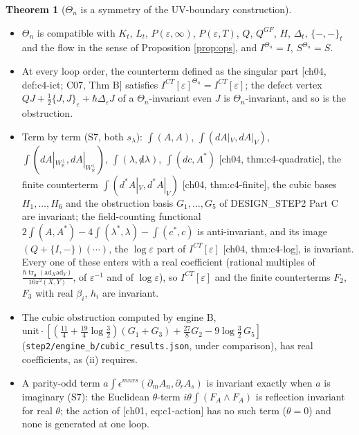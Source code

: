 \documentclass[11pt]{article}
\theoremstyle{definition}
\newtheorem{theorem}[definition]{Theorem}
\begin{document}
\begin{theorem}[$\Theta_n$ is a symmetry of the UV-boundary construction]
\label{thm:inv}
\begin{itemize}
\item[(i)] $\Theta_n$ is compatible with $K_t$, $L_t$, $P(\varepsilon,\infty)$, $P(\varepsilon,T)$, $Q$, $Q^{GF}$, $H$, $\Delta_t$, $\{-,-\}_t$ and the flow in the sense of Proposition \ref{prop:ops}, and $I^{\Theta_n}=I$, $S^{\Theta_n}=S$.
\item[(ii)] At every loop order, the counterterm defined as the singular part [ch04, def:c4-ict; C07, Thm B] satisfies $I^{CT}[\varepsilon]^{\Theta_n}=I^{CT}[\varepsilon]$; the defect vertex $QJ+\frac12\{J,J\}_\varepsilon+\hbar\Delta_\varepsilon J$ of a $\Theta_n$-invariant even $J$ is $\Theta_n$-invariant, and so is the obstruction.
\item[(iii)] Term by term (S7, both $s_\lambda$): $\int(A,A)$, $\int(dA|_V,dA|_V)$, $\int(dA|_{W^\perp_{\mathbb R}},dA|_{W^\perp_{\mathbb R}})$, $\int(\lambda,{\not d}\lambda)$, $\int(dc,A^*)$ [ch04, thm:c4-quadratic], the finite counterterm $\int(d^*A|_V,d^*A|_V)$ [ch04, thm:c4-finite], the cubic bases $H_1,\dots,H_6$ and the obstruction basis $G_1,\dots,G_5$ of DESIGN\_STEP2 Part C are invariant; the field-counting functional $2\int(A,A^*)-4\int(\lambda^*,\lambda)-\int(c^*,c)$ is anti-invariant, and its image $(Q+\{I,-\})(\cdots)$, the $\log\varepsilon$ part of $I^{CT}[\varepsilon]$ [ch04, thm:c4-log], is invariant. Every one of these enters with a real coefficient (rational multiples of $\frac{\hbar\operatorname{tr}_{\mathfrak g}(\mathrm{ad}_X\mathrm{ad}_Y)}{16\pi^2(X,Y)}$, of $\varepsilon^{-1}$ and of $\log\varepsilon$), so $I^{CT}[\varepsilon]$ and the finite counterterms $F_2$, $F_3$ with real $\beta_i$, $h_i$ are invariant.
\item[(iv)] The cubic obstruction computed by engine B, $\mathrm{unit}\cdot[(\frac{11}4+\frac{19}4\log\frac32)(G_1+G_3)+\frac{27}8G_2-9\log\frac32\,G_5]$ (\texttt{step2/engine\_b/cubic\_results.json}, under comparison), has real coefficients, as (ii) requires.
\item[(v)] A parity-odd term $a\int\epsilon^{mnrs}(\partial_mA_n,\partial_rA_s)$ is invariant exactly when $a$ is imaginary (S7): the Euclidean $\theta$-term $i\theta\int(F_A\wedge F_A)$ is reflection invariant for real $\theta$; the action of [ch01, eq:c1-action] has no such term ($\theta=0$) and none is generated at one loop.
\end{itemize}
\end{theorem}
\end{document}
